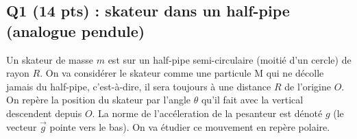 \documentclass[french,10pt]{article}
\begin{document}
	\begin{figure}
	\centering	
		\caption{}
		\label{fig:plan_xz}
	\end{figure}
	
	
	\subsection*{Q1 (14 pts) : skateur dans un half-pipe (analogue pendule)}
	Un skateur de masse $m$ est sur un half-pipe semi-circulaire (moitié d'un cercle) de rayon $R$. On va considérer le skateur comme une particule M qui ne décolle jamais du half-pipe, c'est-à-dire, il sera toujours à une distance $R$ de l'origine $O$. On repère la position du skateur par l'angle $\theta$ qu'il fait avec la vertical descendent depuis $O$. La norme de l'accéleration de la pesanteur est dénoté $g$ (le vecteur $\Vec{g}$ pointe vers le bas). On va étudier ce mouvement en repère polaire.
\end{document}
